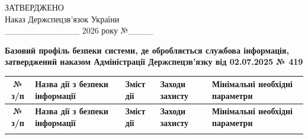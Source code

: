 \documentclass[10pt]{article}
\begin{document}
\begin{flushright}
ЗАТВЕРДЖЕНО\\
Наказ Держспецзв’язок України\\
\_\_\_\_\_\_\_\_\_\_\_\_ 2026 року №\_\_\_\_
\end{flushright}

\begin{center}
\textbf{\large Базовий профіль безпеки системи, де обробляється службова інформація, затверджений наказом Адміністрації Держспецзв’язку від 02.07.2025 № 419}
\end{center}

\footnotesize
\begin{longtable}{|c|>{\raggedright\arraybackslash}p{4cm}|>{\raggedright\arraybackslash}p{6cm}|>{\raggedright\arraybackslash}p{1.5cm}|>{\raggedright\arraybackslash}p{3.5cm}|}
\hline
\textbf{№ з/п} & \textbf{Назва дії з безпеки інформації} & \textbf{Зміст дії} & \textbf{Заходи захисту} & \textbf{Мінімальні необхідні параметри}\\
\hline
\endfirsthead

\hline
\textbf{№ з/п} & \textbf{Назва дії з безпеки інформації} & \textbf{Зміст дії} & \textbf{Заходи захисту} & \textbf{Мінімальні необхідні параметри}\\
\hline
\endhead

\hline
\endfoot

\hline
\endlastfoot


\end{longtable}
\end{document}
